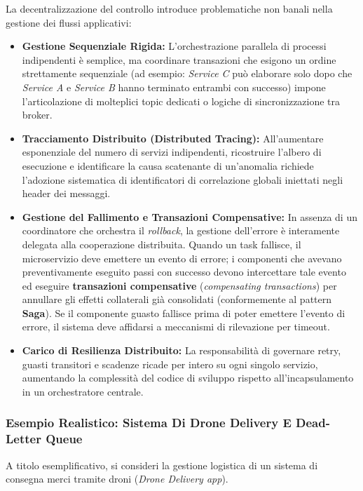 \documentclass[11pt, a4paper]{article}
\begin{document}
La decentralizzazione del controllo introduce problematiche non banali nella gestione dei flussi applicativi:
\begin{itemize}
    \item \textbf{Gestione Sequenziale Rigida:} L'orchestrazione parallela di processi indipendenti è semplice, ma coordinare transazioni che esigono un ordine strettamente sequenziale (ad esempio: \emph{Service C} può elaborare solo dopo che \emph{Service A} e \emph{Service B} hanno terminato entrambi con successo) impone l'articolazione di molteplici topic dedicati o logiche di sincronizzazione tra broker.
    \item \textbf{Tracciamento Distribuito (Distributed Tracing):} All'aumentare esponenziale del numero di servizi indipendenti, ricostruire l'albero di esecuzione e identificare la causa scatenante di un'anomalia richiede l'adozione sistematica di identificatori di correlazione globali iniettati negli header dei messaggi.
    \item \textbf{Gestione del Fallimento e Transazioni Compensative:} In assenza di un coordinatore che orchestra il \emph{rollback}, la gestione dell'errore è interamente delegata alla cooperazione distribuita. Quando un task fallisce, il microservizio deve emettere un evento di errore; i componenti che avevano preventivamente eseguito passi con successo devono intercettare tale evento ed eseguire \textbf{transazioni compensative} (\emph{compensating transactions}) per annullare gli effetti collaterali già consolidati (conformemente al pattern \textbf{Saga}). Se il componente guasto fallisce prima di poter emettere l'evento di errore, il sistema deve affidarsi a meccanismi di rilevazione per timeout.
    \item \textbf{Carico di Resilienza Distribuito:} La responsabilità di governare retry, guasti transitori e scadenze ricade per intero su ogni singolo servizio, aumentando la complessità del codice di sviluppo rispetto all'incapsulamento in un orchestratore centrale.
\end{itemize}

\subsubsection{Esempio Realistico: Sistema Di Drone Delivery E Dead-Letter Queue}

A titolo esemplificativo, si consideri la gestione logistica di un sistema di consegna merci tramite droni (\emph{Drone Delivery app}).
\end{document}

